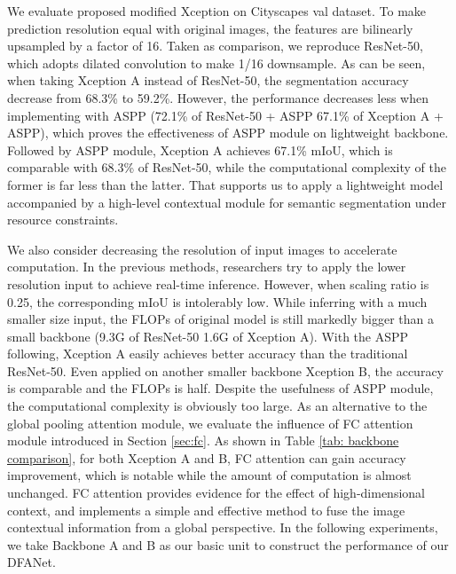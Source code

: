\documentclass[10pt,twocolumn,letterpaper]{article}
\begin{document}
We evaluate proposed modified Xception on Cityscapes val dataset. To make prediction resolution equal with original images, the features are bilinearly upsampled by a factor of 16. Taken as comparison, we reproduce ResNet-50, which adopts dilated convolution to make 1/16 downsample. As can be seen, when taking Xception A instead of ResNet-50, the segmentation accuracy decrease from 68.3\% to 59.2\%.  However, the performance decreases less when implementing with ASPP\cite{deeplanv3} (72.1\% of ResNet-50 + ASPP  67.1\% of Xception A + ASPP), which proves the effectiveness of ASPP module on lightweight backbone. Followed by ASPP module, Xception A achieves 67.1\% mIoU, which is comparable with 68.3\% of ResNet-50, while the computational complexity of the former is far less than the latter. That supports us to apply a lightweight model accompanied by a high-level contextual module for semantic segmentation under resource constraints. 

We also consider decreasing the resolution of input images to accelerate computation. In the previous methods, researchers try to apply the lower resolution input to achieve real-time inference. However, when scaling ratio is 0.25, the corresponding mIoU is intolerably low. While inferring with a much smaller size input, the FLOPs of original model is still markedly bigger than a small backbone (9.3G of ResNet-50  1.6G of Xception A). With the ASPP following, Xception A easily achieves better accuracy than the traditional ResNet-50. Even applied on another smaller backbone Xception B, the accuracy is comparable and the FLOPs is half. Despite the usefulness of ASPP module, the computational complexity is obviously too large. As an alternative to the global pooling attention module, we evaluate the influence of FC attention module introduced in Section \ref{sec:fc}. As shown in Table \ref{tab: backbone comparison}, for both Xception A and B, FC attention can gain  accuracy improvement, which is notable while the amount of computation is almost unchanged. FC attention provides evidence for the effect of high-dimensional context, and implements a simple and effective method to fuse the image contextual information from a global perspective. In the following experiments, we take Backbone A and B as our basic unit to construct the performance of our DFANet.
\end{document}
